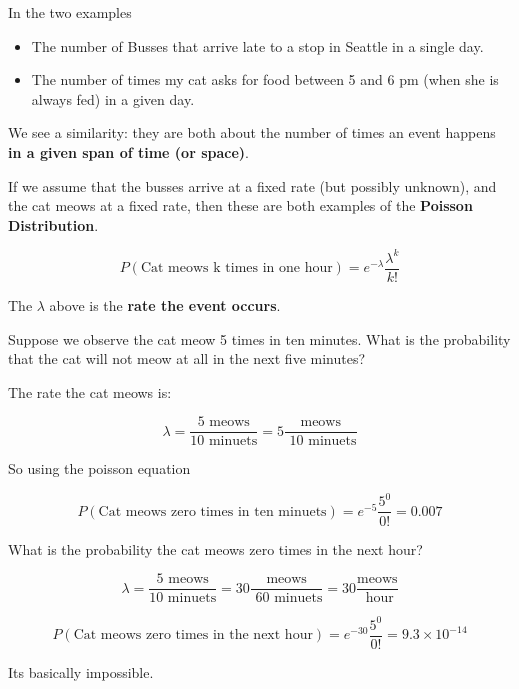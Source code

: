 %
\begin{frame}

In the two examples

\begin{itemize}
\item The number of Busses that arrive late to a stop in Seattle in a single
day.
\item The number of times my cat asks for food between 5 and 6 pm (when she is
always fed) in a given day.
\end{itemize}

We see a similarity: they are both about the number of times an event happens
\textbf{in a given span of time (or space)}.
\end{frame}
%

%
\begin{frame}
If we assume that the busses arrive at a fixed rate (but possibly unknown), and
the cat meows at a fixed rate, then these are both examples of the
\textbf{Poisson Distribution}.

$$ P(\text{Cat meows k times in one hour}) = e^{-\lambda} \frac{\lambda^k}{k!}
$$

The $\lambda$ above is the \textbf{rate the event occurs}.
\end{frame}
%

%
\begin{frame}
Suppose we observe the cat meow 5 times in ten minutes.  What is the probability
that the cat will not meow at all in the next five minutes?
\end{frame}
%

%
\begin{frame}
The rate the cat meows is:

$$ \lambda = \frac{5 \text{ meows}}{10 \text{ minuets}} = 5 \frac{ \text{
meows}}{\text{ 10 minuets}} $$

So using the poisson equation

$$ P(\text{Cat meows zero times in ten minuets}) = e^{-5} \frac{5^0}{0!} = 0.007
$$
\end{frame}
%

%
\begin{frame}
What is the probability the cat meows zero times in the next hour?

$$ 
\lambda = \frac{5 \text{ meows}}{10 \text{ minuets}} = 30 \frac{ \text{
meows}}{\text{ 60 minuets}} = 30 \frac{ \text{
meows}}{\text{ hour}}
$$

$$ P(\text{Cat meows zero times in the next hour}) = e^{-30} \frac{5^0}{0!} =
9.3 \times 10^{-14}
$$

Its basically impossible.
\end{frame}
%

